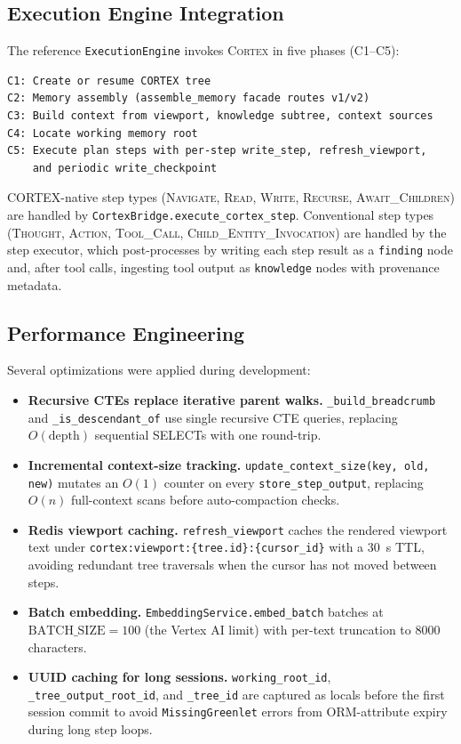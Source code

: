\documentclass[11pt,a4paper]{article}
\theoremstyle{cortexprop}
\newcommand{\op}[1]{\textsc{#1}}
\newcommand{\code}[1]{\texttt{#1}}
\begin{document}
\subsection{Execution Engine Integration}

The reference \code{ExecutionEngine} invokes \textsc{Cortex} in five
phases (C1--C5):

\begin{lstlisting}[basicstyle=\ttfamily\scriptsize]
C1: Create or resume CORTEX tree
C2: Memory assembly (assemble_memory facade routes v1/v2)
C3: Build context from viewport, knowledge subtree, context sources
C4: Locate working memory root
C5: Execute plan steps with per-step write_step, refresh_viewport,
    and periodic write_checkpoint
\end{lstlisting}

CORTEX-native step types (\op{Navigate}, \op{Read}, \op{Write},
\op{Recurse}, \op{Await\_Children}) are handled by
\code{CortexBridge.execute\_cortex\_step}. Conventional step types
(\op{Thought}, \op{Action}, \op{Tool\_Call},
\op{Child\_Entity\_Invocation}) are handled by the step executor, which
post-processes by writing each step result as a \code{finding} node and,
after tool calls, ingesting tool output as \code{knowledge} nodes with
provenance metadata.

\subsection{Performance Engineering}

Several optimizations were applied during development:

\begin{itemize}
  \item \textbf{Recursive CTEs replace iterative parent walks.}
  \code{\_build\_breadcrumb} and \code{\_is\_descendant\_of} use single
  recursive CTE queries, replacing $O(\text{depth})$ sequential SELECTs
  with one round-trip.

  \item \textbf{Incremental context-size tracking.}
  \code{update\_context\_size(key, old, new)} mutates an $O(1)$ counter
  on every \code{store\_step\_output}, replacing $O(n)$ full-context
  scans before auto-compaction checks.

  \item \textbf{Redis viewport caching.} \code{refresh\_viewport} caches
  the rendered viewport text under
  \code{cortex:viewport:\{tree.id\}:\{cursor\_id\}} with a 30~s TTL,
  avoiding redundant tree traversals when the cursor has not moved
  between steps.

  \item \textbf{Batch embedding.} \code{EmbeddingService.embed\_batch}
  batches at $\text{BATCH\_SIZE} = 100$ (the Vertex AI limit) with
  per-text truncation to 8000 characters.

  \item \textbf{UUID caching for long sessions.}
  \code{working\_root\_id}, \code{\_tree\_output\_root\_id}, and
  \code{\_tree\_id} are captured as locals before the first session
  commit to avoid \code{MissingGreenlet} errors from ORM-attribute
  expiry during long step loops.
\end{itemize}
\end{document}
